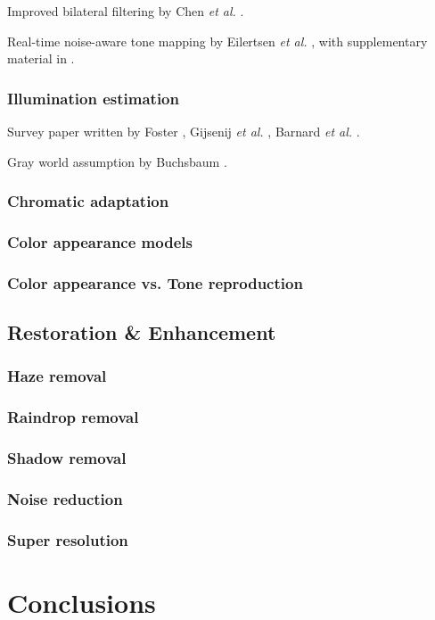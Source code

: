 \documentclass[a4paper]{article}
\begin{document}
Improved bilateral filtering by Chen {\it et al.} \cite{Chen:2007}. 

Real-time noise-aware tone mapping by Eilertsen {\it et al.} \cite{Eilertsen2015}, with supplementary material in \cite{Eilertsen2015supp}.

\subsubsection{Illumination estimation}

Survey paper written by Foster \cite{Foster2011}, Gijsenij {\it et al.} \cite{Gijsenij2011}, Barnard {\it et al.} \cite{Barnard2002a,Barnard2002b}.

Gray world assumption by Buchsbaum \cite{Buchsbaum1980}. 

\subsubsection{Chromatic adaptation}

\subsubsection{Color appearance models}

\subsubsection{Color appearance vs. Tone reproduction}

\subsection{Restoration \& Enhancement}

\subsubsection{Haze removal}

\subsubsection{Raindrop removal}

\subsubsection{Shadow removal}

\subsubsection{Noise reduction}

\subsubsection{Super resolution}

\section{Conclusions}



\end{document}
